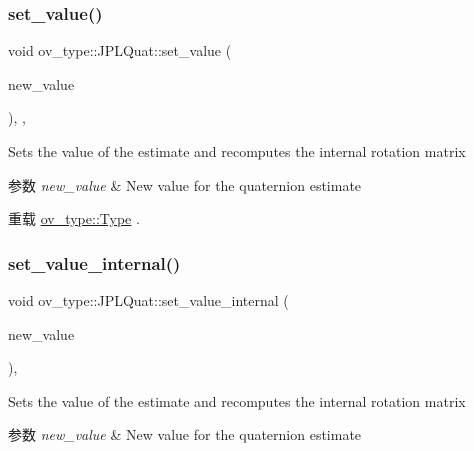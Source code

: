 \subsubsection{\texorpdfstring{set\+\_\+value()}{set\_value()}}
{\footnotesize\ttfamily void ov\+\_\+type\+::\+J\+P\+L\+Quat\+::set\+\_\+value (\begin{DoxyParamCaption}\item[{const Eigen\+::\+Matrix\+Xd \&}]{new\+\_\+value }\end{DoxyParamCaption})\hspace{0.3cm}{\ttfamily [inline]}, {\ttfamily [override]}, {\ttfamily [virtual]}}



Sets the value of the estimate and recomputes the internal rotation matrix 


\begin{DoxyParams}{参数}
{\em new\+\_\+value} & New value for the quaternion estimate \\
\hline
\end{DoxyParams}


重载 \hyperlink{classov__type_1_1Type_a81c73f0b6c10f2550a487019a59796a9}{ov\+\_\+type\+::\+Type} .

\mbox{\label{classov__type_1_1JPLQuat_a0ea10a064e10b3788ec541cf667c8e99}} 
\subsubsection{\texorpdfstring{set\+\_\+value\+\_\+internal()}{set\_value\_internal()}}
{\footnotesize\ttfamily void ov\+\_\+type\+::\+J\+P\+L\+Quat\+::set\+\_\+value\+\_\+internal (\begin{DoxyParamCaption}\item[{const Eigen\+::\+Matrix\+Xd \&}]{new\+\_\+value }\end{DoxyParamCaption})\hspace{0.3cm}{\ttfamily [inline]}, {\ttfamily [protected]}}



Sets the value of the estimate and recomputes the internal rotation matrix 


\begin{DoxyParams}{参数}
{\em new\+\_\+value} & New value for the quaternion estimate \\
\hline
\end{DoxyParams}
\mbox{\label{classov__type_1_1JPLQuat_af0a26f1b03bc7c89abad5dfd985c61cd}} 
